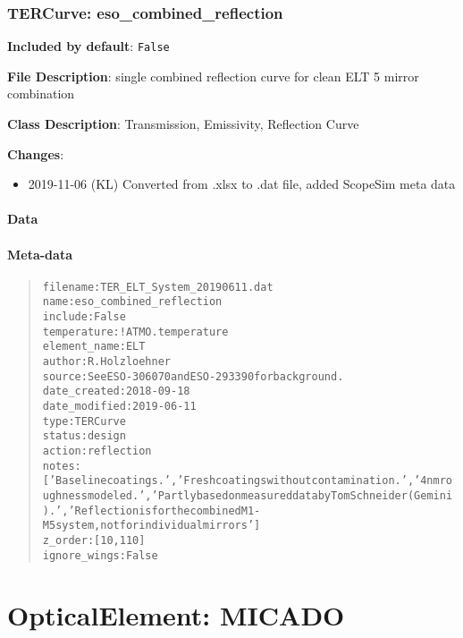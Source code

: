 \documentclass[a4paper]{article}
\begin{document}
\subsubsection{TERCurve: \textquotedbl{}eso\_combined\_reflection\textquotedbl{}%
  \label{tercurve-eso-combined-reflection}%
}

\textbf{Included by default}: \texttt{False}

\textbf{File Description}: single combined reflection curve for clean ELT 5 mirror combination

\textbf{Class Description}: Transmission, Emissivity, Reflection Curve

\textbf{Changes}:

\begin{itemize}
\item 2019-11-06 (KL) Converted from .xlsx to .dat file, added ScopeSim meta data
\end{itemize}


\paragraph{Data%
  \label{id11}%
}


\paragraph{Meta-data%
  \label{id12}%
}

\begin{quote}
\begin{alltt}
     filename : TER_ELT_System_20190611.dat
         name : eso_combined_reflection
      include : False
  temperature : !ATMO.temperature
 element_name : ELT
       author : R. Holzloehner
       source : See ESO-306070 and ESO-293390 for background.
 date_created : 2018-09-18
date_modified : 2019-06-11
         type : TERCurve
       status : design
       action : reflection
        notes : ['Baseline coatings.', 'Fresh coatings without contamination.', '4nm roughness modeled.', 'Partly based on measured data by Tom Schneider (Gemini).', 'Reflection is for the combined M1-M5 system, not for individual mirrors']
      z_order : [10, 110]
 ignore_wings : False
\end{alltt}
\end{quote}


\section{OpticalElement: \textquotedbl{}MICADO\textquotedbl{}%
  \label{opticalelement-micado}%
}
\end{document}

